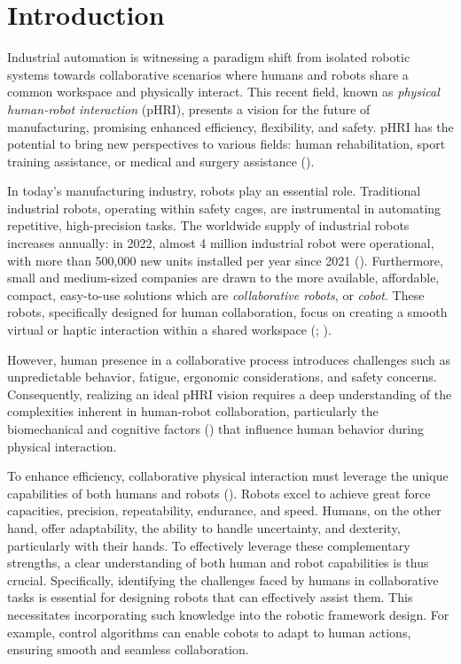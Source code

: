 \setcounter{page}{1}
\pagestyle{fancy}
\chapter*{Introduction}
\label{chapter:introduction}

\setcounter{page}{1}
\pagestyle{fancy}

Industrial automation is witnessing a paradigm shift from isolated robotic systems towards collaborative scenarios where humans and robots share a common workspace and physically interact. This recent field, known as \emph{physical human-robot interaction} (pHRI), presents a vision for the future of manufacturing, promising enhanced efficiency, flexibility, and safety. pHRI has the potential to bring new perspectives to various fields: human rehabilitation, sport training assistance, or medical and surgery assistance (\cite{benoussaadEditorialPhysicalHumanrobot2022}).

In today's manufacturing industry, robots play an essential role. 
Traditional industrial robots, operating within safety cages, are instrumental in automating repetitive, high-precision tasks. The worldwide supply of industrial robots increases annually: in 2022, almost 4 million industrial robot were operational, with more than 500,000 new units installed per year since 2021 (\cite{ifr2023}). Furthermore, small and medium-sized companies are drawn to the more available, affordable, compact, easy-to-use solutions which are \emph{collaborative robots}, or \emph{cobot}. These robots, specifically designed for human collaboration, focus on creating a smooth virtual or haptic interaction within a shared workspace (\cite{peshkinCobotArchitecture2001}; \cite{villaniSurveyHumanRobot2018}).

However, human presence in a collaborative process introduces challenges such as unpredictable behavior, fatigue, ergonomic considerations, and safety concerns. Consequently, realizing an ideal pHRI vision requires a deep understanding of the complexities inherent in human-robot collaboration, particularly the biomechanical and cognitive factors (\cite{camblorExploitationMouvementRobot2024}) that influence human behavior during physical interaction.

To enhance efficiency, collaborative physical interaction must leverage the unique capabilities of both humans and robots (\cite{colgateCobotsRobotsCollaboration1996}). Robots excel to achieve great force capacities, precision, repeatability, endurance, and speed. Humans, on the other hand, offer adaptability, the ability to handle uncertainty, and dexterity, particularly with their hands. To effectively leverage these complementary strengths, a clear understanding of both human and robot capabilities is thus crucial. Specifically, identifying the challenges faced by humans in collaborative tasks is essential for designing robots that can effectively assist them. This necessitates incorporating such knowledge into the robotic framework design. For example, control algorithms can enable cobots to adapt to human actions, ensuring smooth and seamless collaboration. 

